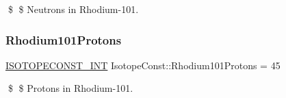\$ \$ Neutrons in Rhodium-\/101. \mbox{\label{group___isotope_const-_rhodium-_rh101_gaef7d93007db50995538de927c6d26046}} 
\subsubsection{\texorpdfstring{Rhodium101\+Protons}{Rhodium101Protons}}
{\footnotesize\ttfamily \mbox{\hyperlink{group___isotope_const-_macros_ga5f18360b3e99483a35c32d789e62621c}{I\+S\+O\+T\+O\+P\+E\+C\+O\+N\+S\+T\+\_\+\+I\+NT}} Isotope\+Const\+::\+Rhodium101\+Protons = 45}

\$ \$ Protons in Rhodium-\/101. 